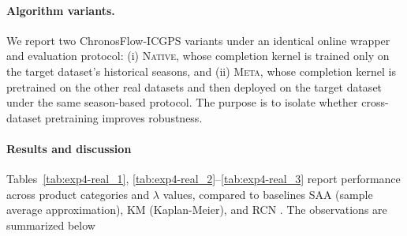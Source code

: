 \documentclass[11pt]{article}
\begin{document}
\paragraph{Algorithm variants.}
We report two ChronosFlow-ICGPS variants under an identical online wrapper and evaluation protocol:
(i) \textsc{Native}, whose completion kernel is trained only on the target dataset’s historical seasons,
and (ii) \textsc{Meta}, whose completion kernel is pretrained on the other real datasets and then
deployed on the target dataset under the same season-based protocol. The purpose is to isolate
whether cross-dataset pretraining improves robustness.

\paragraph{Results and discussion}

Tables~\ref{tab:exp4-real_1}, \ref{tab:exp4-real_2}--\ref{tab:exp4-real_3} report performance across product categories and
\(\lambda\) values, compared to baselines SAA (sample average approximation), KM (Kaplan-Meier), and RCN \citep{hssaine2024censored}. The observations are summarized below
\end{document}
